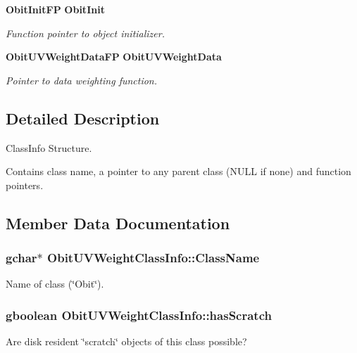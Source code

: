 \begin{CompactItemize}
{\bf Obit\-Init\-FP} {\bf Obit\-Init}
\begin{CompactList}\small\item\em Function pointer to object initializer. \item\end{CompactList}\item 
{\bf Obit\-UVWeight\-Data\-FP} {\bf Obit\-UVWeight\-Data}
\begin{CompactList}\small\item\em Pointer to data weighting function. \item\end{CompactList}\end{CompactItemize}


\subsection{Detailed Description}
Class\-Info Structure. 

Contains class name, a pointer to any parent class (NULL if none) and function pointers. 



\subsection{Member Data Documentation}
\subsubsection{\setlength{\rightskip}{0pt plus 5cm}gchar$\ast$ {\bf Obit\-UVWeight\-Class\-Info::Class\-Name}}\label{structObitUVWeightClassInfo_o2}


Name of class (\char`\"{}Obit\char`\"{}). 

\subsubsection{\setlength{\rightskip}{0pt plus 5cm}gboolean {\bf Obit\-UVWeight\-Class\-Info::has\-Scratch}}\label{structObitUVWeightClassInfo_o1}


Are disk resident \char`\"{}scratch\char`\"{} objects of this class possible? 

